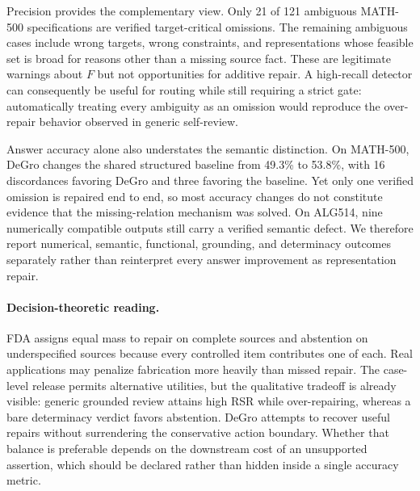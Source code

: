 \documentclass[sigconf,anonymous]{aamas}
\begin{document}
Precision provides the complementary view.  Only 21 of 121 ambiguous MATH-500 specifications are verified target-critical omissions.  The remaining ambiguous cases include wrong targets, wrong constraints, and representations whose feasible set is broad for reasons other than a missing source fact.  These are legitimate warnings about $F$ but not opportunities for additive repair.  A high-recall detector can consequently be useful for routing while still requiring a strict gate: automatically treating every ambiguity as an omission would reproduce the over-repair behavior observed in generic self-review.

Answer accuracy alone also understates the semantic distinction.  On MATH-500, DeGro changes the shared structured baseline from 49.3\% to 53.8\%, with 16 discordances favoring DeGro and three favoring the baseline.  Yet only one verified omission is repaired end to end, so most accuracy changes do not constitute evidence that the missing-relation mechanism was solved.  On ALG514, nine numerically compatible outputs still carry a verified semantic defect.  We therefore report numerical, semantic, functional, grounding, and determinacy outcomes separately rather than reinterpret every answer improvement as representation repair.

\paragraph{Decision-theoretic reading.}
FDA assigns equal mass to repair on complete sources and abstention on underspecified sources because every controlled item contributes one of each.  Real applications may penalize fabrication more heavily than missed repair.  The case-level release permits alternative utilities, but the qualitative tradeoff is already visible: generic grounded review attains high RSR while over-repairing, whereas a bare determinacy verdict favors abstention.  DeGro attempts to recover useful repairs without surrendering the conservative action boundary.  Whether that balance is preferable depends on the downstream cost of an unsupported assertion, which should be declared rather than hidden inside a single accuracy metric.
\end{document}
